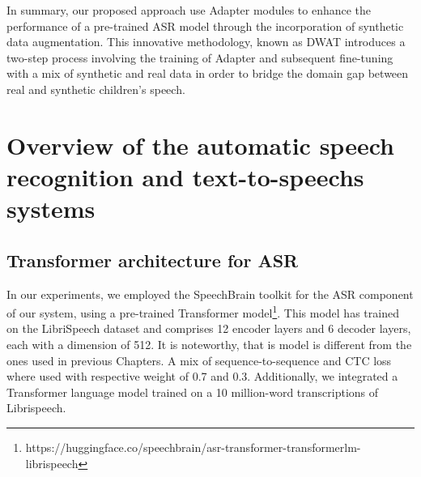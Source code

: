  
In summary, our proposed approach use Adapter modules to enhance the performance of a pre-trained ASR model through the incorporation of synthetic data augmentation. This innovative methodology, known as DWAT introduces a two-step process involving the training of Adapter and subsequent fine-tuning with a mix of synthetic and real data in order to bridge the domain gap between real and synthetic children's speech.





\section{Overview of the automatic speech recognition and text-to-speechs systems}
\label{section:SOA}
\subsection{Transformer architecture for ASR}
In our experiments, we employed the SpeechBrain toolkit \cite{speechbrain} for the ASR component of our system, using a pre-trained Transformer model\footnote{https://huggingface.co/speechbrain/asr-transformer-transformerlm-librispeech}. This model has trained on the LibriSpeech dataset \cite{librispeech} and comprises 12 encoder layers and 6 decoder layers, each with a dimension of 512. It is noteworthy, that is model is different from the ones used in previous Chapters. A mix of sequence-to-sequence and CTC loss where used with respective weight of 0.7 and 0.3. Additionally, we integrated a Transformer language model trained on a 10 million-word transcriptions of Librispeech.


